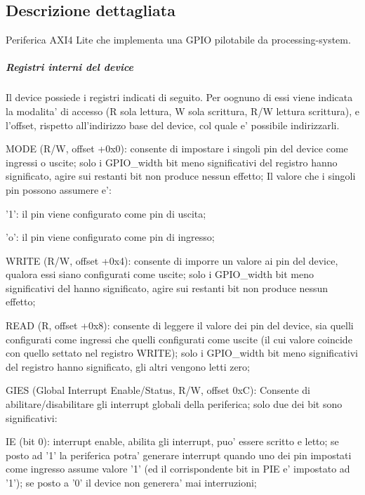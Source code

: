 \subsection{Descrizione dettagliata}
Periferica A\+X\+I4 Lite che implementa una G\+P\+I\+O pilotabile da processing-\/system. 

\subparagraph*{Registri interni del device}

Il device possiede i registri indicati di seguito. Per oognuno di essi viene indicata la modalita' di accesso (R sola lettura, W sola scrittura, R/\+W lettura scrittura), e l'offset, rispetto all'indirizzo base del device, col quale e' possibile indirizzarli.


\begin{DoxyItemize}
\item M\+O\+D\+E (R/\+W, offset +0x0)\+: consente di impostare i singoli pin del device come ingressi o uscite; solo i G\+P\+I\+O\+\_\+width bit meno significativi del registro hanno significato, agire sui restanti bit non produce nessun effetto; Il valore che i singoli pin possono assumere e'\+:
\begin{DoxyItemize}
\item '1'\+: il pin viene configurato come pin di uscita;
\item 'o'\+: il pin viene configurato come pin di ingresso;
\end{DoxyItemize}
\item W\+R\+I\+T\+E (R/\+W, offset +0x4)\+: consente di imporre un valore ai pin del device, qualora essi siano configurati come uscite; solo i G\+P\+I\+O\+\_\+width bit meno significativi del hanno significato, agire sui restanti bit non produce nessun effetto;
\item R\+E\+A\+D (R, offset +0x8)\+: consente di leggere il valore dei pin del device, sia quelli configurati come ingressi che quelli configurati come uscite (il cui valore coincide con quello settato nel registro W\+R\+I\+T\+E); solo i G\+P\+I\+O\+\_\+width bit meno significativi del registro hanno significato, gli altri vengono letti zero;
\item G\+I\+E\+S (Global Interrupt Enable/\+Status, R/\+W, offset 0x\+C)\+: Consente di abilitare/disabilitare gli interrupt globali della periferica; solo due dei bit sono significativi\+:
\begin{DoxyItemize}
\item I\+E (bit 0)\+: interrupt enable, abilita gli interrupt, puo' essere scritto e letto; se posto ad '1' la periferica potra' generare interrupt quando uno dei pin impostati come ingresso assume valore '1' (ed il corrispondente bit in P\+I\+E e' impostato ad '1'); se posto a '0' il device non generera' mai interruzioni;

\end{DoxyItemize}
\end{DoxyItemize}
